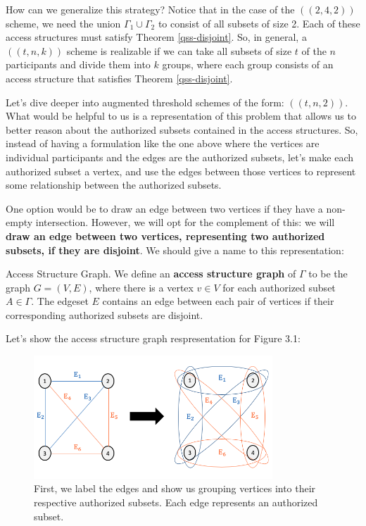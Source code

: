 How can we generalize this strategy? Notice that in the case of the $((2,4,2))$ scheme, we need the union $\Gamma_1 \cup \Gamma_2$ to consist of all subsets of size 2. Each of these access structures must satisfy Theorem \ref{qss-disjoint}. So, in general, a $((t,n,k))$ scheme is realizable if we can take all subsets of size $t$ of the $n$ participants and divide them into $k$ groups, where each group consists of an access structure that satisfies Theorem \ref{qss-disjoint}. 

Let's dive deeper into augmented threshold schemes of the form: $((t,n,2))$. What would be helpful to us is a representation of this problem that allows us to better reason about the authorized subsets contained in the access structures. So, instead of having a formulation like the one above where the vertices are individual participants and the edges are the authorized subsets, let's make each authorized subset a vertex, and use the edges between those vertices to represent some relationship between the authorized subsets.

One option would be to draw an edge between two vertices if they have a non-empty intersection. However, we will opt for the complement of this: we will \textbf{draw an edge between two vertices, representing two authorized subsets, if they are disjoint}. We should give a name to this representation:

\theoremstyle{definition}
\begin{definition}{Access Structure Graph.}
	We define an \textbf{access structure graph} of $\Gamma$ to be the graph $G = (V,E)$, where there is a vertex $v \in V$ for each authorized subset $A \in \Gamma$. The edgeset $E$ contains an edge between each pair of vertices if their corresponding authorized subsets are disjoint.
\end{definition}

Let's show the access structure graph respresentation for Figure 3.1:

\begin{figure}[h]
	\label{2-4-2-label}
	\begin{center}
		\includegraphics[width=0.8\textwidth]{Images/ch3-fig2.png}
	\end{center}
	\caption{First, we label the edges and show us grouping vertices into their respective authorized subsets. Each edge represents an authorized subset.}
\end{figure}

